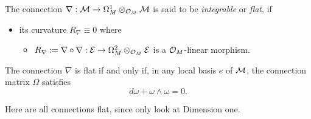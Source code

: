 \begin{defn}
  The connection $\nabla:\mathcal{M}\to \Omega_M^1\otimes_{\mathcal{O}_M}\mathcal{M}$ is said to be
  \emph{integrable} or \emph{flat}, if
  \begin{itemize}
    \item its curvature $R_\nabla\equiv0$
    where
    \begin{itemize}
      \item $R_\nabla:=\nabla\circ\nabla:\mathcal{E}\to\Omega_M^2\otimes_{\mathcal{O}_M}\mathcal{E}$
        is a $\mathcal{O}_M$-linear morphism.
    \end{itemize}
  \end{itemize}
  \begin{s-prop}
    The connection $\nabla$ is flat if and only if, in any local basis $e$ of
    $\mathcal{M}$, the connection matrix $\Omega$ satisfies
    \[
      d\omega + \omega \wedge \omega = 0.
    \]
    \begin{comment}
      This condition is sufficient to assure the existence of local
      fundamental solutions.
    \end{comment}
  \end{s-prop}
  \begin{s-rem}
    Here are all connections flat, since only look at Dimension one.
  \end{s-rem}
  \begin{comment}
    We will say that a connection on a meromorphic bundle is \emph{integrable}
    or \emph{flat} if its restriction to $M\backslash Z$ is an integrable
    connection on the holomorphic bundle $\sM_{|M\backslash Z}$.
  \end{comment}
\end{defn}

